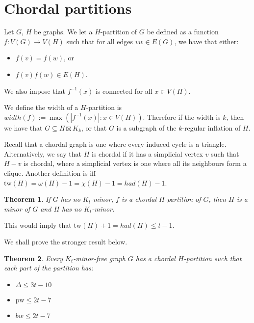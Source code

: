 \documentclass[]{article}
\newcommand{\tw}{\text{tw}}
\newcommand{\pw}{\text{pw}}
\newtheorem{theorem}{Theorem}
\theoremstyle{definition}
\numberwithin{theorem}{section}
\numberwithin{equation}{section}
\begin{document}
\section{Chordal partitions}
Let $G$, $H$ be graphs. We let a $H$-partition of $G$ be defined as a function $f: V(G) \rightarrow V(H)$ such that for all edges $vw \in E(G)$, we have that either:
\begin{itemize}
	\item $f(v) = f(w)$, or
	\item $f(v) f(w) \in E(H)$.
\end{itemize}
We also impose that $f^{-1}(x)$ is connected for all $x \in V(H)$. 

We define the width of a $H$-partition is $width(f) := \max( |f^{-1} (x)| : x \in V(H))$. Therefore if the width is $k$, then we have that $G \subseteq H \boxtimes K_k$, or that $G$ is a subgraph of the $k$-regular inflation of $H$. 

Recall that a chordal graph is one where every induced cycle is a triangle. Alternatively, we say that $H$ is chordal if it has a simplicial vertex $v$ such that $H - v$ is chordal, where a simplicial vertex is one where all its neighbours form a clique. Another definition is iff $\tw(H) = \omega(H) - 1 = \chi(H) - 1 = had(H) - 1$. 


\begin{theorem}
	If $G$ has no $K_t$-minor, $f$ is a chordal $H$-partition of $G$, then $H$ is a minor of $G$ and $H$ has no $K_t$-minor.
\end{theorem}

This would imply that $\tw(H) + 1 = had(H) \leq t - 1$. 

We shall prove the stronger result below. 
\begin{theorem}
	Every $K_t$-minor-free graph $G$ has a chordal $H$-partition such that each part of the partition has:
	\begin{itemize}
		\item $\Delta \leq 3t - 10$
		\item $\pw \leq 2t - 7$
		\item $bw \leq 2t - 7$
	\end{itemize}
\end{theorem}
\end{document}
